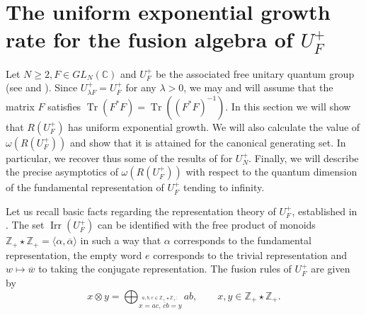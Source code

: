 \documentclass[11 pt, leqno]{amsart}
\newcommand{\ov}{\overline}
\newcommand{\la}{\langle}
\newcommand{\ra}{\rangle}
\newcommand{\CC}{\mathbb{C}}
\newcommand{\ZZ}{\mathbb{Z}}
\DeclareMathOperator{\Irr}{Irr}
\DeclareMathOperator{\Tr}{Tr}
\theoremstyle{definition}
\numberwithin{equation}{section}
\begin{document}
\section{The uniform exponential growth rate for the fusion algebra of $U_F^+$}\label{sec:UF}

Let $N\ge 2, F\in GL_N(\CC)$ and $U_F^+$ be the associated free unitary quantum group (see \cite{BanicaUnitary} and \cite[Section 6.4]{Timmermann}). Since $U_{\lambda F}^+=U_F^+$ for any $\lambda>0$, we may and will assume that the matrix $F$ satisfies $\Tr(F^*F)=\Tr((F^*F)^{-1})$. In this section we will show that $R(U_F^+)$ has uniform exponential growth. We will also calculate the value of $\omega(R(U_F^+))$ and show that it is attained for the canonical generating set. In particular, we recover thus some of the results of \cite{BanicaVergnioux} for $U_N^+$. Finally, we will describe the precise asymptotics of $\omega(R(U_F^+))$ with respect to  the quantum dimension of the fundamental representation of $U_F^+$ tending to infinity.

Let us recall basic facts regarding  the representation theory of $U_F^+$, established in \cite{BanicaUnitary}. The set $\Irr(U_F^+)$ can be identified with the free product of monoids $\ZZ_+\star \ZZ_+=\la \alpha,\ov\alpha\ra $ in such a way that $\alpha$ corresponds to the fundamental representation, the empty word $e$ corresponds to the trivial representation and $w\mapsto \ov{w}$ to taking the conjugate representation. The fusion rules of $U_F^+$ are given by
\begin{equation}\label{eq19}
x\otimes y = \bigoplus_{\overset{a,b,c\in \ZZ_+\star\ZZ_+\colon}{x=ac, \,\ov{c}b=y}}ab,\qquad x,y\in \ZZ_+\star\ZZ_+.
\end{equation}
\end{document}
